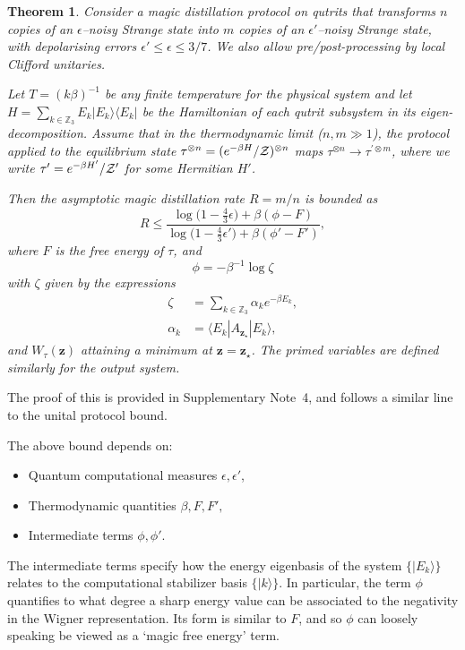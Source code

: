 \documentclass[
onecolumn,
superscriptaddress
]{revtex4-1}
\newtheorem{theorem}{Theorem}
\def\>{\rangle}
\def\<{\langle}
\def\z{\boldsymbol{z}}
\def\Z{{\cal Z}}
\begin{document}
\begin{theorem}\label{thm:free-energy}
	Consider a magic distillation protocol on qutrits that transforms $n$ copies of an $\epsilon$--noisy Strange state into $m$ copies of an $\epsilon'$--noisy Strange state, with depolarising errors $\epsilon' \leq \epsilon \leq 3/7$. We also allow pre/post-processing by local Clifford unitaries.
	
	Let $T =(k\beta)^{-1}$ be any finite temperature for the physical system and let $H= \sum_{k \in \mathbb{Z}_3} E_k |E_k\>\<E_k|$ be the Hamiltonian of each qutrit subsystem in its eigen-decomposition.
Assume that in the thermodynamic limit ($n,m \gg 1$), the protocol applied to the equilibrium state $\tau^{\otimes n} = (e^{-\beta H}/\Z)^{\otimes n}$ maps $\tau^{\otimes n} \longrightarrow \tau^{\prime \otimes m}$, where we write $\tau' = e^{-\beta H'}/\Z'$ for some Hermitian $H'$.

Then the asymptotic magic distillation rate $R = m/n$ is bounded as
\begin{equation}\label{eq:rate_bounds_proof}
	R \leq \dfrac{\log \big( 1-\frac{4}{3}\epsilon \big) + \beta (\phi - F)}{\log \big( 1-\frac{4}{3}\epsilon' \big) + \beta (\phi' - F')},
\end{equation}
where $F$ is the free energy of $\tau$,  and 
\begin{equation}\label{eq:phi}
	\phi = -\beta^{-1} \log \zeta
\end{equation}
with $\zeta$ given by the expressions
\begin{align}
	\zeta &= \sum_{k\in \mathbb{Z}_3} \alpha_k e^{-\beta E_k}, \\
	\alpha_k &= \<E_k| A_{\z_\star} |E_k\>,
\end{align}
and $W_\tau(\z)$ attaining a minimum at $\z=\z_\star$. The primed variables are defined similarly for the output system.
\end{theorem}
\noindent The proof of this is provided in Supplementary Note~4, and follows a similar line to the unital protocol bound.

The above bound depends on: 
\begin{itemize}
\item Quantum computational measures $\epsilon, \epsilon'$,
\item Thermodynamic quantities $\beta, F, F',$
\item Intermediate terms $\phi, \phi'$. 
\end{itemize}
The intermediate terms specify how the energy eigenbasis of the system $\{|E_k\>\}$ relates to the computational stabilizer basis $\{|k\>\}$.  In particular, the term $\phi$ quantifies to what degree a sharp energy value can be associated to the negativity in the Wigner representation. Its form is similar to $F$, and so $\phi$ can loosely speaking be viewed as a `magic free energy' term. 
\end{document}
